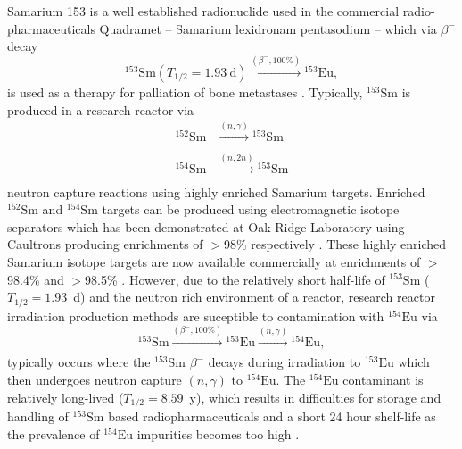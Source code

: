 \documentclass[../main.tex]{subfiles}
\begin{document}
Samarium 153 is a well established radionuclide used in the commercial radio-pharmaceuticals Quadramet \cite{ema2015quadramet} -- Samarium lexidronam pentasodium -- which via $\beta^{-}$ decay 
\begin{equation}
^{153}\mathrm{Sm} \left(T_{1/2} = 1.93~\mathrm{\si{\day}}\right)\xrightarrow[]{\left(\beta^{-},\mathrm{100\%}\right)} {}^{153}\mathrm{Eu},
\label{eq:153Sm_beta_minus_decay}    
\end{equation}
is used as a therapy for palliation of bone metastases \cite{kapoor2021cancer,murray2021systemic}. Typically, $^{153}\mathrm{Sm}$ is produced in a research reactor via 
\begin{align}
^{152}\mathrm{Sm}&\xrightarrow[]{\left(n,\gamma\right)}{}^{153}\mathrm{Sm} \\
^{154}\mathrm{Sm}&\xrightarrow[]{\left(n,2n\right)}{}^{153}\mathrm{Sm}
\label{eq:153Sm_research_reactor_production}
\end{align}
neutron capture reactions using highly enriched Samarium targets. Enriched $^{152}\mathrm{Sm}$ and $^{154}\mathrm{Sm}$ targets can be produced using electromagnetic isotope separators which has been demonstrated at Oak Ridge Laboratory using Caultrons producing enrichments of $>$98\% respectively \cite{bell1987stable}. These highly enriched Samarium isotope targets are now available commercially at enrichments of $>$98.4\% and $>$98.5\% \cite{isoflex2021sm}. However, due to the relatively short half-life of $^{153}\mathrm{Sm}$ ($T_{1/2} = 1.93$~\si{\day}) and the neutron rich environment of a reactor, research reactor irradiation production methods are suceptible to contamination with $^{154}\mathrm{Eu}$ \cite{naseri2021effective,van2018separation} via
\begin{equation}
^{153}\mathrm{Sm}\xrightarrow[]{\left(\beta^{-},\mathrm{100\%}\right)}{}^{153}\mathrm{Eu}\xrightarrow[]{\left(n,\gamma\right)}{}^{154}\mathrm{Eu},
\label{eq:153Sm_reactor_contamination}    
\end{equation}
typically occurs where the $^{153}\mathrm{Sm}$ $\beta^{-}$ decays during irradiation to $^{153}\mathrm{Eu}$ which then undergoes neutron capture $\left(n,\gamma\right)$ to $^{154}\mathrm{Eu}$. The $^{154}\mathrm{Eu}$ contaminant is relatively long-lived ($T_{1/2} = 8.59$~y), which results in difficulties for storage and handling of $^{153}\mathrm{Sm}$ based radiopharmaceuticals and a short 24 hour shelf-life \cite{ema2015quadramet} as the prevalence of $^{154}\mathrm{Eu}$ impurities becomes too high \cite{van2018separation}.
\end{document}
